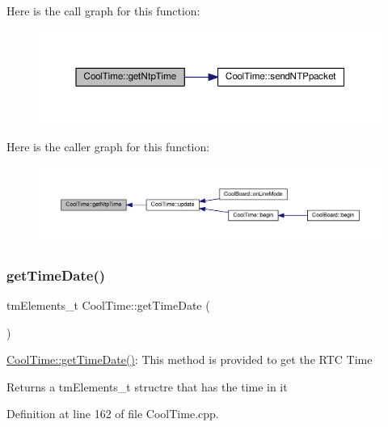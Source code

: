 Here is the call graph for this function\+:\nopagebreak
\begin{figure}[H]
\begin{center}
\leavevmode
\includegraphics[width=350pt]{d6/d49/class_cool_time_a41fbbbfd651c2079f54d4b2911e4c705_cgraph}
\end{center}
\end{figure}
Here is the caller graph for this function\+:\nopagebreak
\begin{figure}[H]
\begin{center}
\leavevmode
\includegraphics[width=350pt]{d6/d49/class_cool_time_a41fbbbfd651c2079f54d4b2911e4c705_icgraph}
\end{center}
\end{figure}
\mbox{\label{class_cool_time_a7a7501c5ca77dd1248bea704c44f986c}} 
\subsubsection{\texorpdfstring{get\+Time\+Date()}{getTimeDate()}}
{\footnotesize\ttfamily tm\+Elements\+\_\+t Cool\+Time\+::get\+Time\+Date (\begin{DoxyParamCaption}{ }\end{DoxyParamCaption})}

\hyperlink{class_cool_time_a7a7501c5ca77dd1248bea704c44f986c}{Cool\+Time\+::get\+Time\+Date()}\+: This method is provided to get the R\+TC Time

\begin{DoxyReturn}{Returns}
a tm\+Elements\+\_\+t structre that has the time in it 
\end{DoxyReturn}


Definition at line 162 of file Cool\+Time.\+cpp.


